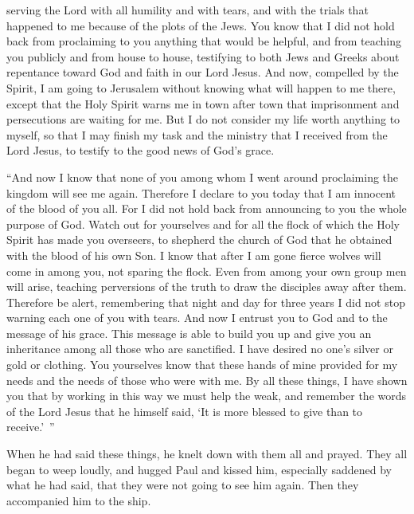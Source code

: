 {serving
the Lord
with
all
humility
and
with tears,
and
with
the trials
that happened
to me
because of the plots
of the Jews.
You know that I did
not
hold back
from proclaiming
to you
anything that would be helpful,
and
from teaching
you
publicly
and
from house to house,
testifying
to both
Jews
and
Greeks
about repentance
toward
God
and
faith
in
our
Lord
Jesus.
And
now,
compelled
by the Spirit,
I
am going
to
Jerusalem
without
knowing
what will happen
to me
there,
except
that
the Holy
Spirit
warns
me
in town after town
that
imprisonment
and
persecutions
are waiting for
me.
But
I do
not
consider
my life
worth
anything to myself,
so that
I may finish
my
task
and
the ministry
that
I received
from
the Lord
Jesus,
to testify
to the good news
of God’s
grace.
\par }{\PP {}“And
now
I
know
that
none
of you
among
whom
I went around
proclaiming
the kingdom
will see
me again.
Therefore
I declare
to you
today
that
I am
innocent
of
the blood
of you all.
For
I did not
hold back
from announcing
to you
the whole
purpose
of God.
Watch out
for yourselves
and
for all
the flock
of which
the Holy
Spirit
has made
you
overseers,
to shepherd
the church
of God
that
he obtained
with
the blood
of his own Son.
I
know
that
after
I
am gone
fierce
wolves
will come in
among
you,
not
sparing
the flock.
Even
from among
your own group
men
will arise,
teaching
perversions of the truth
to draw
the disciples
away
after
them.
Therefore
be alert,
remembering
that night
and
day
for
three years
I did
not
stop
warning
each
one
of you with
tears.
And
now
I entrust
you
to God
and
to the message
of his
grace.
This message is able
to build
you up
and
give
you an inheritance
among
all
those who are sanctified.
I have desired
no one’s
silver
or
gold
or
clothing.
You
yourselves
know
that
these
hands
of mine provided for my
needs
and
the needs
of those who were
with
me.
By all
these things,
I have shown
you
that
by working
in this way
we must
help
the weak,
and
remember
the words
of the Lord
Jesus
that
he
himself
said,
‘It is
more
blessed
to give
than
to receive.’ ”
\par }{\PP {}When
he had said
these things,
he
knelt down
with
them
all
and prayed.
They all
began
to weep
loudly,
and
hugged
Paul
and kissed
him,
especially
saddened
by
what
he had said,
that
they were
not
going
to see
him
again. Then
they accompanied
him
to
the ship.

}
